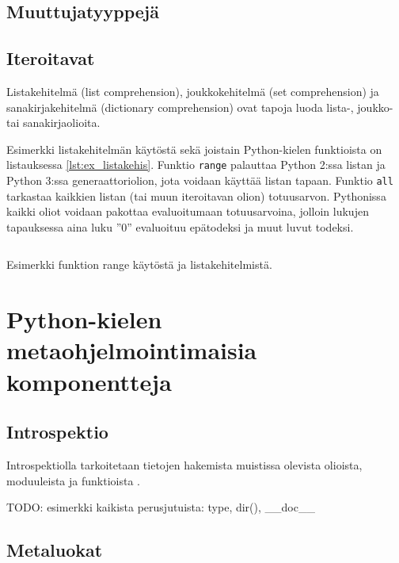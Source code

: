 \documentclass[finnish]{tktltiki2}
\theoremstyle{definition}
\theoremstyle{remark}
\begin{document}

\subsection{Muuttujatyyppejä}

\subsection{Iteroitavat}

Listakehitelmä (list comprehension), joukkokehitelmä (set comprehension) ja sanakirjakehitelmä (dictionary comprehension) ovat tapoja luoda lista-, joukko- tai sanakirjaolioita. 

Esimerkki listakehitelmän käytöstä sekä joistain Python-kielen funktioista on listauksessa \ref{lst:ex_listakehis}. Funktio \verb|range| palauttaa Python 2:ssa listan ja Python 3:ssa generaattoriolion, jota voidaan käyttää listan tapaan. Funktio \verb|all| tarkastaa kaikkien listan (tai muun iteroitavan olion) totuusarvon. Pythonissa kaikki oliot voidaan pakottaa evaluoitumaan totuusarvoina, jolloin lukujen tapauksessa aina luku ''0'' evaluoituu epätodeksi ja muut luvut todeksi.

\begin{listing}
    \inputminted{python}{code/luvut.py}
    \label{lst:ex_listakehis}
    \caption{Esimerkki funktion range käytöstä ja listakehitelmistä.}
\end{listing}


\section{Python-kielen metaohjelmointimaisia komponentteja}

\subsection{Introspektio}

Introspektiolla tarkoitetaan tietojen hakemista muistissa olevista olioista, moduuleista ja funktioista \cite{dive-into-python}.

TODO: esimerkki kaikista perusjutuista: type, dir(), \_\_doc\_\_

\cite{dive-into-python}

\subsection{Metaluokat}
\end{document}
